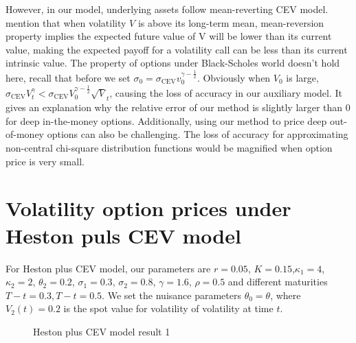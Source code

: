 However, in our model, underlying assets follow mean-reverting CEV model. \cite{grunbichler_valuing_1996} mention that when volatility $V$ is above its long-term mean, mean-reversion property implies the expected future value of V will be lower than its current value, making the expected payoff for a volatility call can be less than its current intrinsic value. The property of options under Black-Scholes world doesn't hold here, recall that before we set $\sigma_0 = \sigma_{\text{CEV}}v_0^{\gamma-\frac{1}{2}}$. Obviously when $V_0$ is large, $\sigma_{\text{CEV}} V^{\gamma}_t < \sigma_{\text{CEV}}V_0^{\gamma-\frac{1}{2}} \sqrt{V}_t$, causing the loss of accuracy in our auxiliary model. It gives an explanation why the relative error of our method is slightly larger than 0 for deep in-the-money options. Additionally, using our method to price deep out-of-money options can also be challenging. The loss of accuracy for approximating non-central chi-square distribution functions would be magnified when option price is very small.


\section{Volatility option prices under Heston puls CEV model}

For Heston plus CEV model, our parameters are $r=0.05$, $K=0.15$,$\kappa_1=4$, $\kappa_2=2$, $\theta_2=0.2$, $\sigma_1=0.3$, $\sigma_2=0.8$, $\gamma=1.6$, $\rho=0.5$ and different maturities $T-t=0.3, T-t=0.5$. We set the nuisance parameters $\theta_0 = \theta$, where $V_2(t)=0.2$ is the spot value for volatility of volatility at time $t$.

\begin{figure}[ht]
  \centering
  \hfill
  \caption{Heston plus CEV model result 1}
\end{figure}

